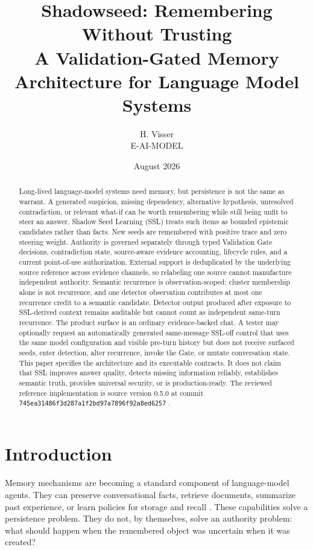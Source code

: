 \documentclass[11pt]{article}
\title{\textbf{Shadowseed: Remembering Without Trusting}\\[0.45em]
\large A Validation-Gated Memory Architecture for Language Model Systems}
\author{H. Visser\\[0.3em]\small E-AI-MODEL}
\date{August 2026}
\newcommand{\implcommit}{\nolinkurl{745ea31486f3d287a1f2bd97a7896f92a8ed6257}}
\newcommand{\sourceversion}{0.5.0}
\begin{document}
\maketitle

\begin{abstract}
Long-lived language-model systems need memory, but persistence is not the same as warrant. A generated suspicion, missing dependency, alternative hypothesis, unresolved contradiction, or relevant what-if can be worth remembering while still being unfit to steer an answer. Shadow Seed Learning (SSL) treats such items as bounded epistemic candidates rather than facts. New seeds are remembered with positive trace and zero steering weight. Authority is governed separately through typed Validation Gate decisions, contradiction state, source-aware evidence accounting, lifecycle rules, and a current point-of-use authorization. External support is deduplicated by the underlying source reference across evidence channels, so relabeling one source cannot manufacture independent authority. Semantic recurrence is observation-scoped: cluster membership alone is not recurrence, and one detector observation contributes at most one recurrence credit to a semantic candidate. Detector output produced after exposure to SSL-derived context remains auditable but cannot count as independent same-turn recurrence. The product surface is an ordinary evidence-backed chat. A tester may optionally request an automatically generated same-message SSL-off control that uses the same model configuration and visible pre-turn history but does not receive surfaced seeds, enter detection, alter recurrence, invoke the Gate, or mutate conversation state. This paper specifies the architecture and its executable contracts. It does not claim that SSL improves answer quality, detects missing information reliably, establishes semantic truth, provides universal security, or is production-ready. The reviewed reference implementation is source version \sourceversion{} at commit \implcommit{} \citep{shadowseed2026}.
\end{abstract}

\section{Introduction}

Memory mechanisms are becoming a standard component of language-model agents. They can preserve conversational facts, retrieve documents, summarize past experience, or learn policies for storage and recall \citep{lewis2020rag,guu2020realm,packer2023memgpt,tan2025membench,yu2026agentic,lan2026ema}. These capabilities solve a persistence problem. They do not, by themselves, solve an authority problem: what should happen when the remembered object was uncertain when it was created?
\end{document}

